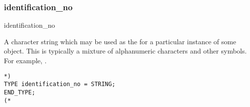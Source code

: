 \documentclass{article}
\begin{document}
\subsubsection{identification\_no}

\begin{Mnamedesc}{identification_no}
\begin{Mdesctext}
A character string which may be used as the  for a
particular instance of some object. This is typically a mixture of
alphanumeric characters and other symbols. For example, .
\end{Mdesctext}

\begin{Mexp}
\begin{verbatim}
*)
TYPE identification_no = STRING;
END_TYPE;
(*
\end{verbatim}
\end{Mexp}
\end{Mnamedesc}
\end{document}
